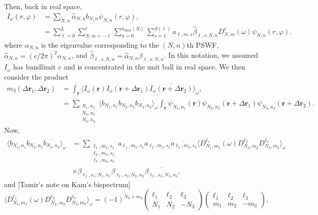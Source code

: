 \documentclass[english,11pt]{article}
\newcommand{\1}{\mathbf{1}}
\newcommand{\rr}{\textbf{r}}
\numberwithin{equation}{section}
\theoremstyle{plain}
\theoremstyle{definition}
\theoremstyle{remark}
\theoremstyle{plain}
\theoremstyle{remark}
\theoremstyle{plain}
\theoremstyle{plain}
\begin{document}
Then, back in real space,
\[\begin{aligned} I_{\omega}(r,\varphi) &= \sum_{N,n}\widehat{\alpha}_{N,n}b_{N,n}\psi_{N,n}(r,\varphi),\\
&= \sum_{\ell=0}^L\sum_{N,m=-\ell}^{\ell}\sum_{n=0}^{n_{\text{max}}(N)}\sum_{s=1}^{S(\ell)}a_{\ell,m,s}\widehat\beta_{\ell,s;N,n}D_{N,m}^{\ell}(\omega)\psi_{N,n}(r,\varphi).
\end{aligned}\]
where $\alpha_{N,n}$ is the eigenvalue corresponding to the $(N,n)$th PSWF, $\widehat{\alpha}_{N,n} = (c/2\pi)^2\alpha_{N,n}$, and $\widehat\beta_{\ell,s;N,n}=\widehat\alpha_{N,n}\beta_{\ell,s;N,n}$. In this notation, we assumed $I_{\omega}$ has bandlimit $c$ and is concentrated in the unit ball in real space. We then consider the product
\[\begin{aligned} m_3(\Delta\rr_1,\Delta\rr_2) &= \int_{\rr}\langle I_{\omega}(\rr)I_{\omega}(\rr+\Delta\rr_1)\overline{I_{\omega}(\rr+\Delta\rr_2)}\rangle_{\omega},\\
&= \sum_{\substack{N_1,n_1\\N_2,n_2\\N_3,n_3}} \langle b_{N_1,n_1}b_{N_2,n_2}\overline{b_{N_3,n_3}}\rangle_{\omega}\int_{\rr}\psi_{N_1,n_1}(\rr)\psi_{N_2,n_2}(\rr+\Delta\rr_1)\overline{\psi_{N_3,n_3}(\rr+\Delta\rr_2)}.\end{aligned}\]
Now,
\[\begin{aligned} \langle b_{N_1,n_1}b_{N_2,n_2}\overline{b_{N_3,n_3}}\rangle_{\omega} &= \sum_{\substack{\ell_1,m_1,s_1\\\ell_2,m_2,s_2\\\ell_3,m_3,s_3}}a_{\ell_1,m_1,s_1}a_{\ell_2,m_2,s_2}\overline{a_{\ell_3,m_3,s_3}}\langle D_{N_1,m_1}^{\ell_1}(\omega)D_{N_2,m_2}^{\ell_2}\overline{D_{N_3,m_3}^{\ell_3}}\rangle_{\omega}\\
&\times \beta_{\ell_1,s_1;N_1,n_1}\beta_{\ell_2,s_2;N_2,n_2}\overline{\beta_{\ell_3,s_3;N_3,n_3}},\end{aligned}\]
and [Tamir's note on Kam's bispectrum]
\[ \langle D_{N_1,m_1}^{\ell_1}(\omega)D_{N_2,m_2}^{\ell_2}\overline{D_{N_3,m_3}^{\ell_3}}\rangle_{\omega} = (-1)^{N_3+m_3}\left(\begin{array}{ccc}\ell_1 & \ell_2  & \ell_3\\ N_1 & N_2 & -N_3\end{array}\right)\left(\begin{array}{ccc}\ell_1 & \ell_2  & \ell_3\\ m_1 & m_2 & -m_3\end{array}\right),\
\]
\end{document}
